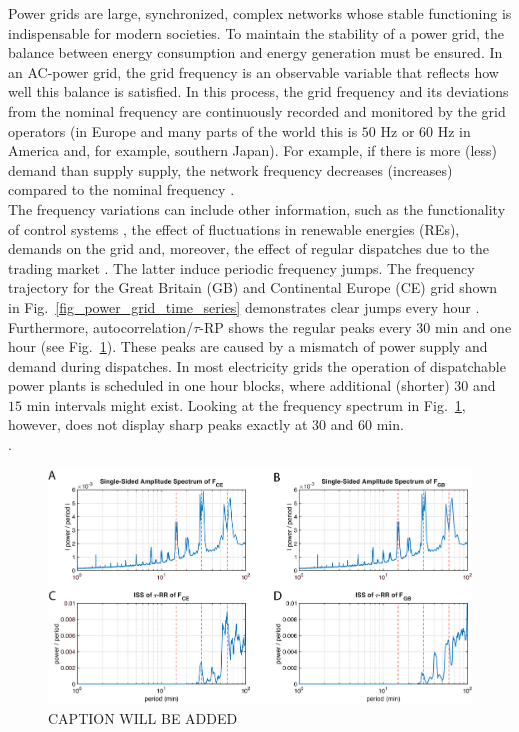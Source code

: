 \documentclass[entropy,article,submit,pdftex,moreauthors]{Definitions/mdpi}
\begin{document}
Power grids are large, synchronized, complex networks whose stable functioning is indispensable for modern societies.
To maintain the stability of a power grid, the balance between energy consumption and energy generation must be ensured. 
In an AC-power grid, the grid frequency is an observable variable that reflects how well this balance is satisfied. 
In this process, the grid frequency and its deviations from the nominal frequency are continuously recorded and monitored by 
the grid operators (in Europe and many parts of the world this is $50$ \si{Hz} or $60$ \si{Hz} in America and, for example, southern Japan).
For example, if there is more (less) demand than supply supply, the network frequency decreases (increases) compared to the nominal frequency \cite{kundur1994power}.
\\
The frequency variations can include other information, such as the functionality of control systems \cite{gorjao2020data}, the effect of fluctuations in
renewable energies (REs), demands on the grid \cite{anvari2020stochastic} and, moreover, the effect of regular dispatches due to the trading market 
\cite{meyer2020identifying}. The latter induce periodic frequency jumps. The frequency trajectory for the Great Britain (GB) and Continental Europe (CE) 
grid shown in Fig.~\ref{fig_power_grid_time_series} demonstrates clear jumps every hour . 
Furthermore, autocorrelation/$\tau$-RP shows the regular peaks every $30$ \si{min} and one hour (see Fig.~\ref{fig_power_grid_spectra}). These peaks are caused by a mismatch of power 
supply and demand \cite{weissbach2009high} during dispatches. In most electricity grids the
operation of dispatchable power plants is scheduled in one hour blocks, where additional (shorter) $30$ and $15$ \si{min} intervals
might exist. Looking at the frequency spectrum in Fig.~\ref{fig_power_grid_spectra}, however, does not display sharp peaks exactly at $30$ and $60$ \si{min}. \\

.


\begin{figure}
 \centering
 \includegraphics[width=\textwidth]{./figures/fig_power_grid_spectra}
 \caption{CAPTION WILL BE ADDED}
\label{fig_power_grid_spectra}
\end{figure}
\end{document}
